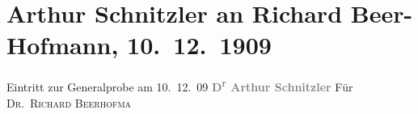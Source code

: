 

         
         \renewcommand{\erwaehntePersonen}{Personen: Richard Beer-Hofmann}
         \renewcommand{\erwaehnteOrte}{Orte: Wien}
         \renewcommand{\erwaehnteWerke}{Werke: Der Ruf des Lebens. Schauspiel in drei Akten}
               \section[Arthur Schnitzler an Richard Beer-Hofmann, 10. 12. 1909]{ Arthur Schnitzler an Richard Beer-Hofmann, 10. 12. 1909}\nopagebreak{}\rehead{ }\begin{ledgroupsized}[t]{13cm}\normalsize\beginnumbering \toendnotes[C]{\smallbreak\pagebreak[2]} 
\toendnotes[C]{\smallbreak}\pstart
           \noindent{}{\pb}Eintritt zur Generalprobe am 10. 12. 09\pend
           \pstart
           \centering{}\textcolor{gray}{\textbf{D\textsuperscript{r} Arthur Schnitzler}}\pend
           \pstart
           \noindent{}\raggedleft{}Für \textsc{Dr. Richard Beerhofma{\geminationn}}\pend
           
         
         \endnumbering{}\end{ledgroupsized}  \newcommand{\dateiname}{L01896}\newcommand{\titel}{Arthur Schnitzler an Richard Beer-Hofmann, 10. 12. 1909}\newcommand{\editorInnen}{Martin Anton Müller und Gerd-Hermann Susen}
      